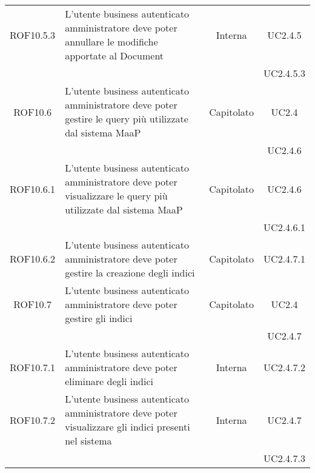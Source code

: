 \begin{longtable}{|c|p{6cm}|c|c|}
\midrule
ROF10.5.3
& L'utente business autenticato amministratore deve poter annullare le modifiche apportate al Document
& Interna
& UC2.4.5\\
& & & UC2.4.5.3
\\

\midrule
ROF10.6
& L'utente business autenticato amministratore deve poter gestire le query più utilizzate dal sistema MaaP
& Capitolato
& UC2.4\\
& & & UC2.4.6
\\

\midrule
ROF10.6.1
& L'utente business autenticato amministratore deve poter visualizzare le query più utilizzate dal sistema MaaP
& Capitolato
& UC2.4.6\\
& & & UC2.4.6.1
\\

\midrule
ROF10.6.2
& L'utente business autenticato amministratore deve poter gestire la creazione degli indici
& Capitolato
& UC2.4.7.1\\


\midrule
ROF10.7
& L'utente business autenticato amministratore deve poter gestire gli indici
& Capitolato
& UC2.4\\
& & & UC2.4.7
\\

\midrule
ROF10.7.1
& L'utente business autenticato amministratore deve poter eliminare degli indici
& Interna
& UC2.4.7.2\\


\midrule
ROF10.7.2
& L'utente business autenticato amministratore deve poter visualizzare gli indici presenti nel sistema
& Interna
& UC2.4.7\\
& & & UC2.4.7.3
\\


\end{longtable}

\newpage
